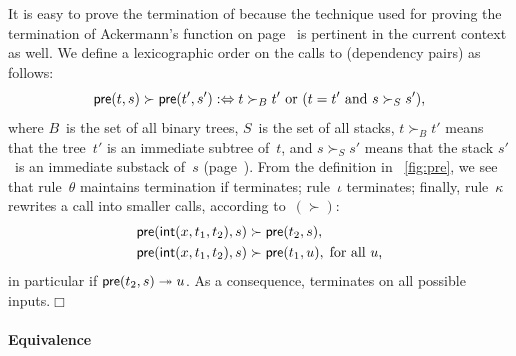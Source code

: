 It is easy to prove the termination of
 because the technique used for
proving the termination of Ackermann's function on
page~\pageref{par:ackermann} is pertinent in the current context as
well. We define a lexicographic order on the calls to 
(dependency pairs) as follows:
\begin{equation}
\textsf{pre}(t,s) \succ \textsf{pre}(t',s') :\Leftrightarrow \text{\(t
  \succ_{B} t'\) or (\(t = t'\) and \(s \succ_{S} s'\))},
\label{eq:BS_order}
\end{equation}
where \(B\)~is the set of all binary trees, \(S\)~is the set of all
stacks, \(t \succ_{B} t'\) means that the tree~\(t'\) is an immediate
subtree of~\(t\), and \(s
\succ_{S} s'\) means that the stack \(s'\)~is an immediate
substack of~\(s\)
(page~\pageref{par:well-founded}).  From the definition in
\fig~\vref{fig:pre}, we see that rule~\(\theta\) maintains termination
if  terminates; rule~\(\iota\)
terminates; finally, rule~\(\kappa\) rewrites a call into smaller
calls, according to~\((\succ)\):
\begin{align*}
  \textsf{pre}(\textsf{int}(x,t_1,t_2),s) &\succ \textsf{pre}(t_2,s),\\
  \textsf{pre}(\textsf{int}(x,t_1,t_2),s) &\succ \textsf{pre}(t_1,u),\; \text{for
    all~\(u\),}
\end{align*}
in particular if \(\textsf{pre}(t_2,s) \twoheadrightarrow u\). As a
consequence,  terminates on all
possible inputs.\hfill\(\Box\)

\paragraph{Equivalence}

